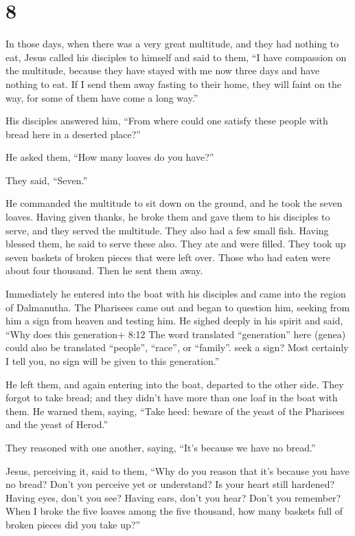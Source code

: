\hypertarget{section-7}{%
\section{8}\label{section-7}}

 In those days, when there was a very great multitude, and
they had nothing to eat, Jesus called his disciples to himself and said
to them,  ``I have compassion on the multitude, because they
have stayed with me now three days and have nothing to eat. 
If I send them away fasting to their home, they will faint on the way,
for some of them have come a long way.''

 His disciples answered him, ``From where could one satisfy
these people with bread here in a deserted place?''

 He asked them, ``How many loaves do you have?''

They said, ``Seven.''

 He commanded the multitude to sit down on the ground, and
he took the seven loaves. Having given thanks, he broke them and gave
them to his disciples to serve, and they served the multitude.
 They also had a few small fish. Having blessed them, he
said to serve these also.  They ate and were filled. They
took up seven baskets of broken pieces that were left over. 
Those who had eaten were about four thousand. Then he sent them away.

 Immediately he entered into the boat with his disciples
and came into the region of Dalmanutha.  The Pharisees came
out and began to question him, seeking from him a sign from heaven and
testing him.  He sighed deeply in his spirit and said,
``Why does this generation+ 8:12 The word translated ``generation'' here
(genea) could also be translated ``people'', ``race'', or ``family''.
seek a sign? Most certainly I tell you, no sign will be given to this
generation.''

 He left them, and again entering into the boat, departed
to the other side.  They forgot to take bread; and they
didn't have more than one loaf in the boat with them.  He
warned them, saying, ``Take heed: beware of the yeast of the Pharisees
and the yeast of Herod.''

 They reasoned with one another, saying, ``It's because we
have no bread.''

 Jesus, perceiving it, said to them, ``Why do you reason
that it's because you have no bread? Don't you perceive yet or
understand? Is your heart still hardened?  Having eyes,
don't you see? Having ears, don't you hear? Don't you remember?
 When I broke the five loaves among the five thousand, how
many baskets full of broken pieces did you take up?''

